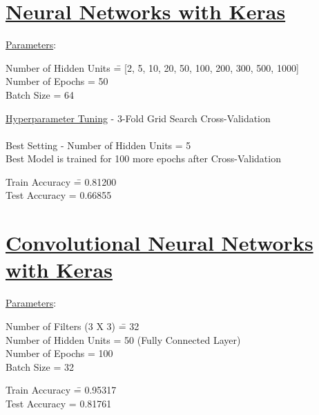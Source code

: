 \documentclass[12pt]{article}
\begin{document}
\section*{\underline{Neural Networks with Keras}}
\begin{addmargin}[0.3in]{0in}
\underline{Parameters}:
\begin{tabbing}
Number of Hidden Units \= = [2, 5, 10, 20, 50, 100, 200, 300, 500, 1000] \\
Number of Epochs \> = 50 \\
Batch Size \> = 64 \\
\end{tabbing}
\underline{Hyperparameter Tuning} - 3-Fold Grid Search Cross-Validation \\ \\
Best Setting - Number of Hidden Units = 5 \\
Best Model is trained for 100 more epochs after Cross-Validation \\
\begin{tabbing}
Train Accuracy \= = 0.81200 \\
Test Accuracy \> = 0.66855 \\
\end{tabbing}
\end{addmargin}

\section*{\underline{Convolutional Neural Networks with Keras}}
\begin{addmargin}[0.3in]{0in}
\underline{Parameters}:
\begin{tabbing}
Number of Filters (3 X 3) \= = 32 \\
Number of Hidden Units \> = 50 (Fully Connected Layer) \\
Number of Epochs \> = 100 \\
Batch Size \> = 32 \\
\end{tabbing}
\begin{tabbing}
Train Accuracy \= = 0.95317 \\
Test Accuracy \> = 0.81761 \\
\end{tabbing}
\end{addmargin}
\end{document}
